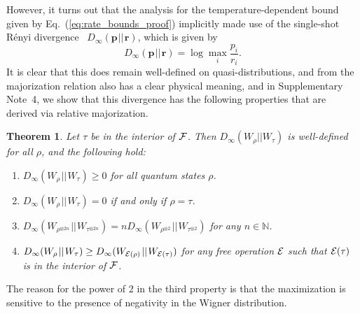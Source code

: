 \documentclass[
onecolumn,
superscriptaddress
]{revtex4-1}
\newtheorem{theorem}{Theorem}
\def\r{\boldsymbol{r}}
\def\p{\boldsymbol{p}}
\def\E{{\cal E}}
\def\F{{\cal F}}
\begin{document}
However, it turns out that the analysis for the temperature-dependent bound given by Eq.~(\ref{eq:rate_bounds_proof}) implicitly made use of the single-shot R\'{e}nyi divergence~\cite{renyi_1960} $D_\infty (\p \hspace{1pt}||\hspace{1pt} \r)$, which is given by
\begin{equation}
	D_\infty (\p \hspace{1pt}||\hspace{1pt} \r) = \log \max_i \frac{p_i}{r_i}.
\end{equation}
It is clear that this does remain well-defined on quasi-distributions, and from the majorization relation also has a clear physical meaning, and in Supplementary Note~4, we show that this divergence has the following properties that are derived via relative majorization.
\begin{theorem}\label{thm:Dinfty}
	Let $\tau$ be in the interior of $\F$. Then $D_\infty(W_\rho || W_\tau)$ is well-defined for all $\rho$, and the following hold:
\begin{enumerate}
\item $D_\infty(W_\rho \hspace{1pt}||\hspace{1pt} W_\tau) \ge 0$ for all quantum states $\rho$.
\item  $D_\infty(W_\rho \hspace{1pt}||\hspace{1pt} W_\tau) = 0$ if and only if $\rho =\tau$.
\item $D_\infty(W_{\rho^{\otimes 2n}} \hspace{1pt}||\hspace{1pt} W_{\tau^{\otimes 2n}}) = n D_\infty(W_{\rho^{\otimes 2}} \hspace{1pt}||\hspace{1pt} W_{\tau^{\otimes 2}})$ for any $n \in \mathbb{N}$.
\item $D_\infty(W_\rho \hspace{1pt}||\hspace{1pt} W_\tau) \geq D_\infty(W_{\E(\rho)} \hspace{1pt}||\hspace{1pt} W_{\E(\tau)})$ for any free operation $\E$ such that $\E(\tau)$ is in the interior of $\F$.
\end{enumerate}
\end{theorem}
The reason for the power of $2$ in the third property is that the maximization is sensitive to the presence of negativity in the Wigner distribution.
\end{document}

